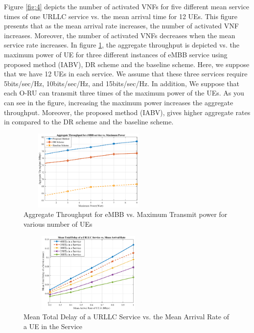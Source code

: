 \documentclass[lettersize,journal]{IEEEtran}
\begin{document}
Figure \ref{fig:4} depicts the number of activated VNFs for five different mean service times of one URLLC service vs. the mean arrival time for 12 UEs. This figure presents that as the mean arrival rate increases, the number of activated VNF increases. Moreover, the number of activated VNFs decreases when the mean service rate increases.
In figure \ref{fig:5}, the aggregate throughput is depicted vs. the maximum power of UE for three different instances of eMBB service using proposed method (IABV), DR scheme and the baseline scheme. Here, we suppose that we have 12 UEs in each service.  We assume that these three services require 5bits/sec/Hz, 10bits/sec/Hz, and 15bits/sec/Hz.
In addition, We suppose that each O-RU can transmit three times of the maximum power of the UEs. As you can see in the figure, increasing the maximum power increases the aggregate throughput. Moreover, the proposed method (IABV), gives higher aggregate rates in compared to the DR scheme and the baseline scheme.
\begin{figure}%
  \centering
  \captionsetup{justification=centering}
    \includegraphics[width=7cm,height=4cm]{RatePower1.eps}
    \caption{Aggregate Throughput for eMBB vs. Maximum Transmit power for various number of UEs }
  \label{fig:5}
\end{figure}
\begin{figure}
  \centering
  \captionsetup{justification=centering}
      \includegraphics[width=7cm,height=4cm]{delay_new.eps}
  \caption{Mean Total Delay of a URLLC Service vs. the Mean Arrival Rate of a UE in the Service}
  \label{fig:6}
\end{figure}
\end{document}
